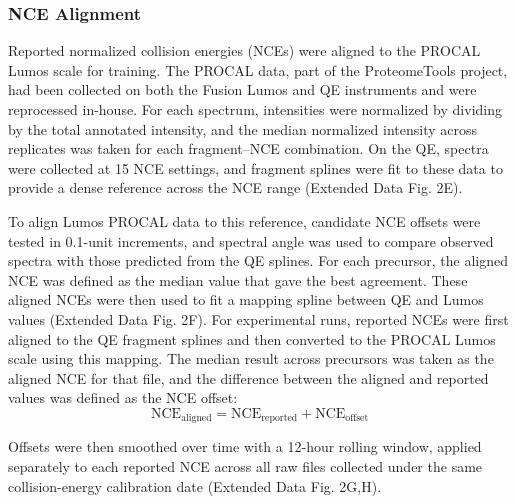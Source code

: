 \documentclass[pdflatex,sn-nature]{sn-jnl}
\begin{document}
\subsubsection{NCE Alignment}\label{subsubsec:nce-alignment}
Reported normalized collision energies (NCEs) were aligned to the PROCAL Lumos scale for training. The PROCAL data, part of the ProteomeTools project, had been collected on both the Fusion Lumos and QE instruments and were reprocessed in-house. For each spectrum, intensities were normalized by dividing by the total annotated intensity, and the median normalized intensity across replicates was taken for each fragment–NCE combination. On the QE, spectra were collected at 15 NCE settings, and fragment splines were fit to these data to provide a dense reference across the NCE range (Extended Data Fig. 2E).

To align Lumos PROCAL data to this reference, candidate NCE offsets were tested in 0.1-unit increments, and spectral angle was used to compare observed spectra with those predicted from the QE splines. For each precursor, the aligned NCE was defined as the median value that gave the best agreement. These aligned NCEs were then used to fit a mapping spline between QE and Lumos values (Extended Data Fig. 2F).
For experimental runs, reported NCEs were first aligned to the QE fragment splines and then converted to the PROCAL Lumos scale using this mapping. The median result across precursors was taken as the aligned NCE for that file, and the difference between the aligned and reported values was defined as the NCE offset:
\begin{equation} 
    \text{NCE}_{\text{aligned}} = \text{NCE}_{\text{reported}} + \text{NCE}_{\text{offset}}
\end{equation}

Offsets were then smoothed over time with a 12-hour rolling window, applied separately to each reported NCE across all raw files collected under the same collision-energy calibration date (Extended Data Fig. 2G,H).

\end{document}
